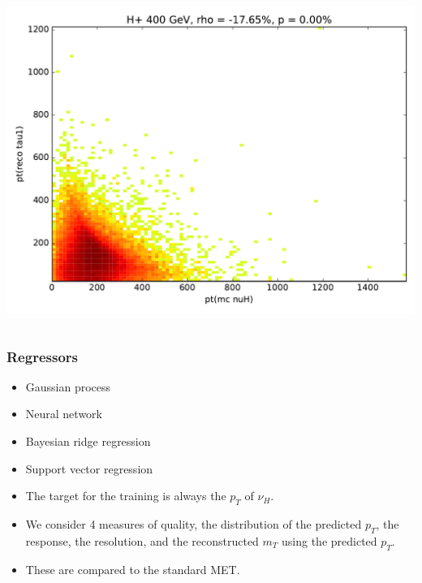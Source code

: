 \documentclass[9pt, lualatex]{beamer}
\begin{document}
\begin{frame}
\begin{columns}
        \includegraphics[width=\textwidth]{correlations/hp400_pt_reco_tau1.pdf}
    \end{columns}

\end{frame}

\begin{frame}
    \frametitle{Regressors}
    \begin{itemize}
    \item Gaussian process
    \item Neural network
    \item Bayesian ridge regression
    \item Support vector regression
    \end{itemize}
    \vfill
    \begin{itemize}
        \item The target for the training is always the $p_T$ of $\nu_H$.
        \item We consider 4 measures of quality, the distribution of the predicted $p_T$, the response, the resolution,
            and the reconstructed $m_T$ using the predicted $p_T$.
        \item These are compared to the standard MET.
    \end{itemize}
\end{frame}
\end{document}
